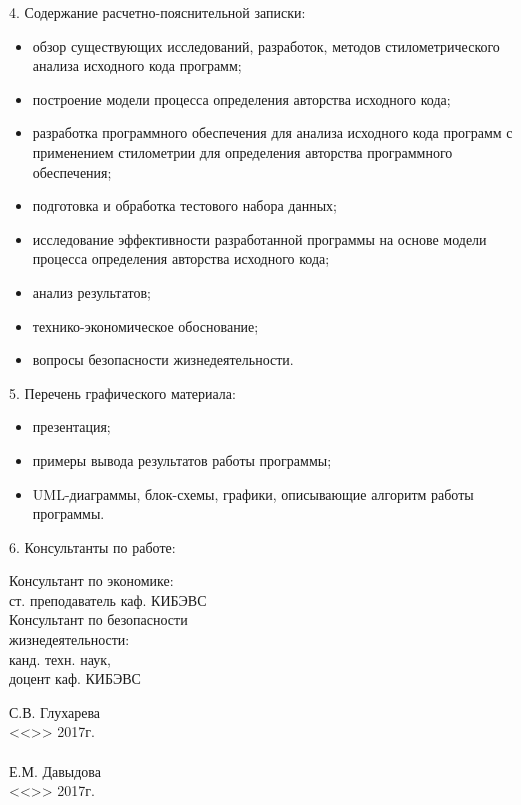 4. Содержание расчетно-пояснительной записки:
\begin{itemize}
 \item обзор существующих исследований, разработок, методов стилометрического анализа исходного кода программ;
 \item построение модели процесса определения авторства исходного кода;
 \item разработка программного обеспечения для анализа исходного кода программ с применением стилометрии для определения авторства программного обеспечения;
 \item подготовка и обработка тестового набора данных;
 \item исследование эффективности разработанной программы на основе модели процесса определения авторства исходного кода;
 \item анализ результатов;
 \item технико-экономическое обоснование;
 \item вопросы безопасности жизнедеятельности.
\end{itemize}

5. Перечень графического материала: 
\begin{itemize}
 \item презентация;
 \item примеры вывода результатов работы программы;
 \item UML-диаграммы, блок-схемы, графики, описывающие алгоритм работы программы.
\end{itemize}

6. Консультанты по работе:
\vspace{0.01cm}
\begin{singlespace}
 \begin{minipage}[left]{0.40\linewidth}
 Консультант по экономике:\\
 ст. преподаватель каф. КИБЭВС \\

 Консультант по безопасности\\ жизнедеятельности:\\
 канд. техн. наук,\\ доцент каф. КИБЭВС\\
 \end{minipage}
  \hfill
 \begin{minipage}[left]{0.45\linewidth}
  \vspace{0.7cm}
 \underline{\hspace{2.5cm}}С.В. Глухарева \\
 <<\underline{\hspace{1cm}}>>\underline{\hspace{3cm}} 2017г.\\
 \vspace{0.3cm}\\ 
 \underline{\hspace{2.5cm}}Е.М. Давыдова\\
 <<\underline{\hspace{1cm}}>>\underline{\hspace{3cm}} 2017г.\\
 \end{minipage}
\end{singlespace}

